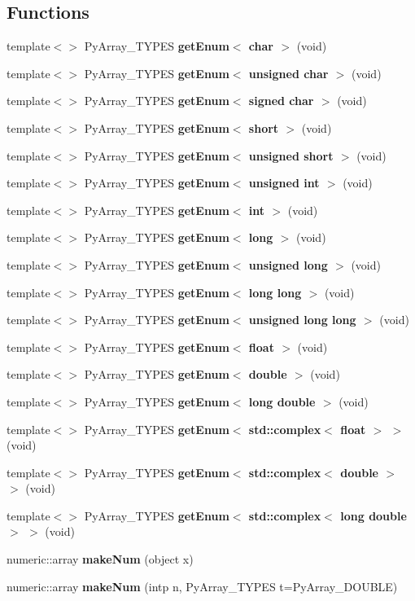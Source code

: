 \subsection*{Functions}
\begin{CompactItemize}
\item 
template$<$$>$ Py\-Array\_\-TYPES {\bf get\-Enum$<$ char $>$} (void)
\item 
template$<$$>$ Py\-Array\_\-TYPES {\bf get\-Enum$<$ unsigned char $>$} (void)
\item 
template$<$$>$ Py\-Array\_\-TYPES {\bf get\-Enum$<$ signed char $>$} (void)
\item 
template$<$$>$ Py\-Array\_\-TYPES {\bf get\-Enum$<$ short $>$} (void)
\item 
template$<$$>$ Py\-Array\_\-TYPES {\bf get\-Enum$<$ unsigned short $>$} (void)
\item 
template$<$$>$ Py\-Array\_\-TYPES {\bf get\-Enum$<$ unsigned int $>$} (void)
\item 
template$<$$>$ Py\-Array\_\-TYPES {\bf get\-Enum$<$ int $>$} (void)
\item 
template$<$$>$ Py\-Array\_\-TYPES {\bf get\-Enum$<$ long $>$} (void)
\item 
template$<$$>$ Py\-Array\_\-TYPES {\bf get\-Enum$<$ unsigned long $>$} (void)
\item 
template$<$$>$ Py\-Array\_\-TYPES {\bf get\-Enum$<$ long long $>$} (void)
\item 
template$<$$>$ Py\-Array\_\-TYPES {\bf get\-Enum$<$ unsigned long long $>$} (void)
\item 
template$<$$>$ Py\-Array\_\-TYPES {\bf get\-Enum$<$ float $>$} (void)
\item 
template$<$$>$ Py\-Array\_\-TYPES {\bf get\-Enum$<$ double $>$} (void)
\item 
template$<$$>$ Py\-Array\_\-TYPES {\bf get\-Enum$<$ long double $>$} (void)
\item 
template$<$$>$ Py\-Array\_\-TYPES {\bf get\-Enum$<$ std::complex$<$ float $>$ $>$} (void)
\item 
template$<$$>$ Py\-Array\_\-TYPES {\bf get\-Enum$<$ std::complex$<$ double $>$ $>$} (void)
\item 
template$<$$>$ Py\-Array\_\-TYPES {\bf get\-Enum$<$ std::complex$<$ long double $>$ $>$} (void)
\item 
numeric::array {\bf make\-Num} (object x)
\item 
numeric::array {\bf make\-Num} (intp n, Py\-Array\_\-TYPES t=Py\-Array\_\-DOUBLE)
\item 
$$
\end{CompactItemize}
